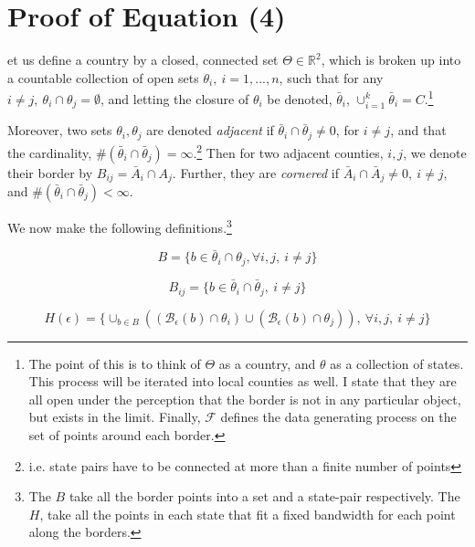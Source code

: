 \documentclass{article}
\begin{document}
\section{Proof of Equation (4)}

et us define a country by a closed, connected set $\Theta \in \mathbb{R}^{2}$, which is broken up into a countable collection of open sets $\theta_{i},\ i = 1,...,n$, such that for any $i \neq j,\ \theta_{i} \cap \theta_{j} = \emptyset$, and letting the closure of $\theta_{i}$ be denoted, $\bar \theta_{i}$, $\cup_{i=1}^{k}\bar \theta_{i} = C$.\footnote{The point of this is to think of $\Theta$ as a country, and $\theta$ as a collection of states. This process will be iterated into local counties as well. I state that they are all open under the perception that the border is not in any particular object, but exists in the limit. Finally, $\mathcal{F}$ defines the data generating process on the set of points around each border.}

Moreover, two sets $\theta_{i}, \theta_{j}$ are denoted \textit{adjacent} if $\bar \theta_{i} \cap \bar \theta_{j} \neq 0$, for $i \neq j$, and that the cardinality, $\# (\bar \theta_{i} \cap \bar \theta_{j}) = \infty$.\footnote{i.e. state pairs have to be connected at more than a finite number of points} Then for two adjacent counties, $i,j$, we denote their border by $B_{ij} = \bar A_{i} \cap A_{j}$. Further, they are \textit{cornered} if  $\bar A_{i} \cap \bar A_{j} \neq 0,\ i \neq j$, and $\#(\bar \theta_{i} \cap \bar \theta_{j}) < \infty$.

We now make the following definitions.\footnote{The $B$ take all the border points into a set and a state-pair respectively. The $H$, take all the points in each state that fit a fixed bandwidth for each point along the borders.}

\begin{equation} B = \{ b \in \bar \theta_{i} \cap \theta_{j}, \forall i, j,\ i \neq j\} \end{equation}

\begin{equation} B_{ij} = \{ b \in \bar \theta_{i} \cap \bar \theta_{j},\ i \neq j\} \end{equation}

\begin{equation} H(\epsilon) = \{\cup_{b \in B}\left((\mathcal{B}_{\epsilon}(b)\cap\theta_{i})\cup(\mathcal{B}_{\epsilon}(b)\cap\theta_{j})\right),\ \forall i,j,\ i \neq j\} \end{equation}
\end{document}
